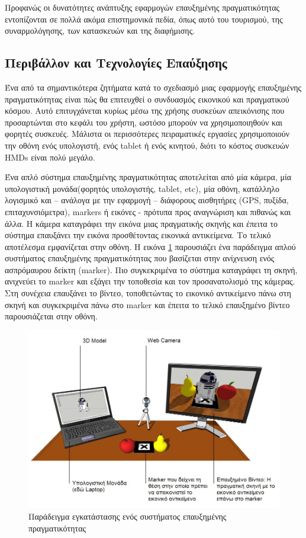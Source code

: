 Προφανώς οι δυνατότητες ανάπτυξης εφαρμογών επαυξημένης πραγματικότητας εντοπίζονται σε πολλά ακόμα επιστημονικά πεδία, όπως αυτό του τουρισμού, της συναρμολόγησης, των κατασκευών και της διαφήμισης.



\subsection{Περιβάλλον και Τεχνολογίες Επαύξησης}
Ένα από τα σημαντικότερα ζητήματα κατά το σχεδιασμό μιας εφαρμογής επαυξημένης πραγματικότητας είναι πώς θα επιτευχθεί ο συνδυασμός εικονικού και πραγματικού κόσμου. Αυτό επιτυγχάνεται κυρίως μέσω της χρήσης συσκεύων απεικόνισης που προσαρτώνται στο κεφάλι του χρήστη, ωστόσο μπορούν να χρησιμοποιηθούν και φορητές συσκευές.
Μάλιστα οι περισσότερες πειραματικές εργασίες χρησιμοποιούν την οθόνη ενός υπολογιστή, ενός tablet ή ενός κινητού, διότι το κόστος συσκευών HMDs είναι πολύ μεγάλο. 

Ένα απλό σύστημα επαυξημένης πραγματικότητας αποτελείται από μία κάμερα, μία υπολογιστική μονάδα(φορητός υπολογιστής, tablet, etc), μία οθόνη, κατάλληλο λογισμικό και – ανάλογα με την εφαρμογή – διάφορους αισθητήρες (GPS, πυξίδα, επιταχυνσιόμετρα), markers ή εικόνες - πρότυπα προς αναγνώριση και πιθανώς και άλλα.
Η κάμερα καταγράφει την εικόνα μιας πραγματικής σκηνής και έπειτα το σύστημα επαυξάνει την εικόνα προσθέτοντας εικονικά αντικείμενα. Το τελικό αποτέλεσμα εμφανίζεται στην οθόνη.
Η εικόνα \ref{fig:ar_example} παρουσιάζει ένα παράδειγμα απλού συστήματος επαυξημένης πραγματικότητας που βασίζεται στην ανίχνευση ενός ασπρόμαυρου δείκτη (marker).
Πιο συγκεκριμένα το σύστημα καταγράφει τη σκηνή, ανιχνεύει το marker και εξάγει την τοποθεσία και τον προσανατολισμό της κάμερας. Στη συνέχεια επαυξάνει το βίντεο, τοποθετώντας το εικονικό αντικείμενο πάνω στη σκηνή και συγκεκριμένα πάνω στο marker και έπειτα το τελικό επαυξημένο βίντεο παρουσιάζεται στην οθόνη.


\begin{figure}[H]
    \centering
    \includegraphics[scale=0.25, angle=0]{Files/Figures/ar_system_example.jpg}
    \caption[Παράδειγμα εγκατάστασης ενός συστήματος επαυξημένης πραγματικότητας ]{ Παράδειγμα εγκατάστασης ενός συστήματος επαυξημένης πραγματικότητας \cite{ar_example}}
    \label{fig:ar_example}
\end{figure}


